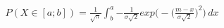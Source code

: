 \documentclass[preview]{standalone}
\begin{document}
\begin{align*}
\quad\\ \quad\\P( X \in [a;b] ) = { \frac{1}{\sqrt{\pi}} } \int_b^a { { - \frac{1}{\sigma \sqrt{2}} } exp\Big(-{ \Big( \frac{m - x}{\sigma \sqrt{2}} \Big)^2 }\Big) } \, dx
\end{align*}
\end{document}
